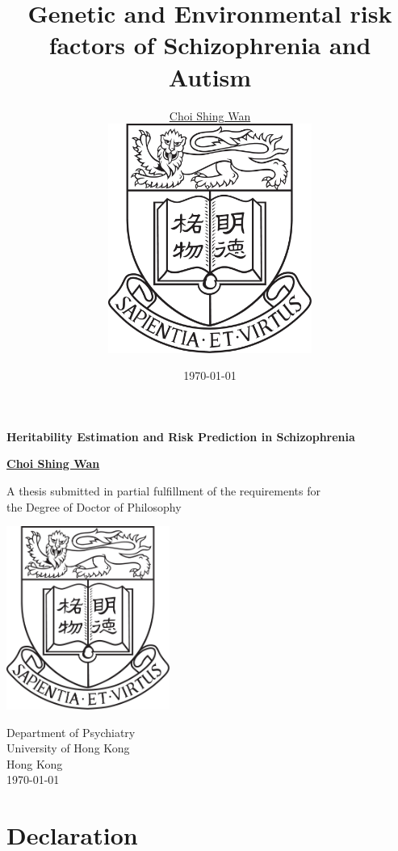 \documentclass{book}
\title{Genetic and Environmental risk factors of Schizophrenia and Autism}
\date{\today}
\author{\href{mailto:choishingwan@gmail.com}{Choi Shing Wan}\\
	\includegraphics[width=0.5\textwidth]{hkuLogo.jpg}}
\begin{document}
\thispagestyle{empty}
\pagestyle{empty}

\begin{titlepage}
	\begin{center}
		\vspace*{1cm}
		
		\Huge
		\textbf{Heritability Estimation and Risk Prediction in Schizophrenia}
		
		\vspace{0.5cm}
		\LARGE
		
		\vspace{1.5cm}
		
		\textbf{\href{mailto:choishingwan@gmail.com}{Choi Shing Wan}}
		
		\vfill
		
		A thesis submitted in partial fulfillment of the requirements for \\
		the Degree of Doctor of Philosophy
		
		\vspace{0.8cm}
		
		\includegraphics[width=0.4\textwidth]{hkuLogo.jpg}
		
		\Large
		Department of Psychiatry\\
		University of Hong Kong\\
		Hong Kong\\
		\today
		
	\end{center}
\end{titlepage}


\frontmatter 

	\cleardoublepage
	\chapter*{Declaration}
	\cleardoublepage
\end{document}
